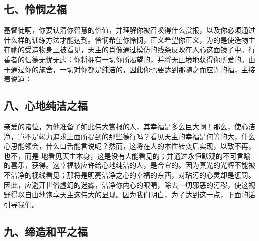 
\subsection{七、怜悯之福}

 基督徒啊，你要认清你智慧的价值，并理解你被召唤得什么赏报，以及你必须通过什么样的训练方法才能达到。怜悯希望你怜悯，正义希望你正义，为的是使造物主在祂的受造物身上被看见，天主的肖像通过模仿的线条反映在人心这面镜子中。行善者的信德无忧无虑：你将拥有一切你所渴望的，并将无止境地获得你所爱的。由于通过你的施舍，一切对你都是纯洁的，因此你也要达到那随之而应许的福，主接着说道：\par


\subsection{八、心地纯洁之福}

 亲爱的诸位，为他准备了如此伟大赏报的人，其幸福是多么巨大啊！那么，使心洁净，岂不是竭力追求上面所提到的那些德行吗？看见天主的幸福是何等的大，什么心思能领会，什么口舌能言说呢？然而，这将在人的本性转变后实现，以致不再，也不，而是 地看见天主本身，这是没有人能看见的；并通过永恒默观的不可言喻的喜乐，获得。这幸福被应许给心地纯洁的人，是合宜的。因为真光的光辉不能被不洁净的视线看见；那将是明亮洁净之心的幸福的东西，对玷污的心灵却是惩罚。因此，应避开世俗虚幻的迷雾，洁净你内心的眼睛，除去一切邪恶的污秽，使这视野得以自由地饱享天主这伟大的显现。因为我们明白，为了达到这一点，下面的话引导我们。\par


\subsection{九、缔造和平之福}


